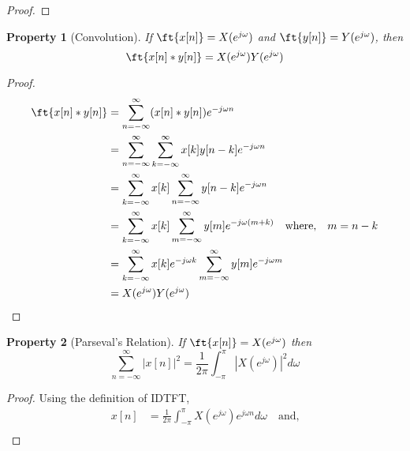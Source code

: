 \documentclass{home_assignment}
\newtheorem{theorem}{Property}
\begin{document}
{\begin{proof}
                            \end{proof}
        \begin{theorem}[Convolution]
            If $\ft{x[n]}=X(e^{j\omega})$ and $\ft{y[n]}=Y(e^{j\omega})$, then
            \begin{equation*}
            \ft{x[n]*y[n]}=X(e^{j\omega})Y(e^{j\omega})
            \end{equation*}
            \end{theorem}
            \begin{proof}
            \begin{equation*}
                \begin{aligned} 
                   \ft{x[n]*y[n]}&=\sum_{n=-\infty}^{\infty} (x[n]*y[n]) e^{-j\omega n}\\
                   &=\sum_{n=-\infty}^{\infty} \sum_{k=-\infty}^{\infty} x[k]y[n-k] e^{-j\omega n}\\
                   &=\sum_{k=-\infty}^{\infty} x[k] \sum_{n=-\infty}^{\infty} y[n-k] e^{-j\omega n}\\
                   &=\sum_{k=-\infty}^{\infty} x[k] \sum_{m=-\infty}^{\infty} y[m] e^{-j\omega (m+k)}\quad \text{where,}\quad m=n-k\\
                   &=\sum_{k=-\infty}^{\infty} x[k] e^{-j\omega k} \sum_{m=-\infty}^{\infty} y[m] e^{-j\omega m} \\
                   &=X(e^{j\omega})Y(e^{j\omega})
                \end{aligned}
                \end{equation*}
            \end{proof}
            \begin{theorem}[Parseval's Relation]
                If $\ft{x[n]}=X(e^{j\omega})$ then
                \begin{equation*}
                    \sum_{n=-\infty}^{\infty} |x[n]|^2=\frac{1}{2\pi}\int_{-\pi}^{\pi}|X(e^{j\omega})|^2 d\omega
                \end{equation*}
                \end{theorem}
                \begin{proof}
                    Using the definition of IDTFT,
                    \begin{equation*}
                        \begin{aligned} 
                            x[n]&=\frac{1}{2\pi}\int_{-\pi}^{\pi}X(e^{j\omega})e^{j\omega n} d\omega \quad \text{and,}\\

\end{aligned}
\end{equation*}
\end{proof}}
\end{document}
